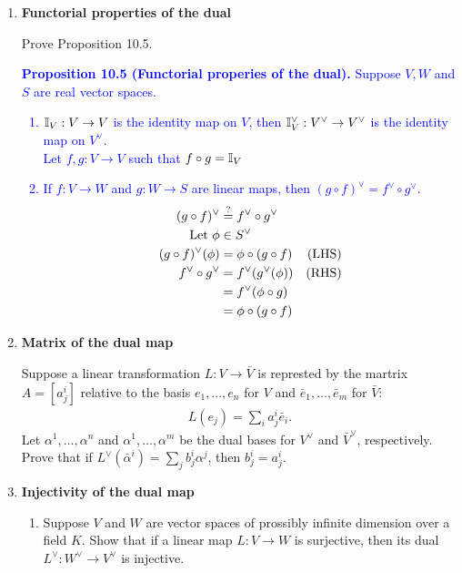 \documentclass[12pt,a4paper]{report}
\newcommand{\BLUE}[1]{\textcolor{blue}{#1}}
\begin{document}
\begin{enumerate}[label=10.\arabic*.]
\item \textbf{Functorial properties of the dual}

Prove Proposition 10.5.

\BLUE{\textbf{Proposition 10.5 (Functorial properies of the dual).}  Suppose $V, W$ and $S$ are real vector spaces.
\begin{enumerate}[label=(\roman*)]
	\item $\mathbb{I}_V: V \to V$ is the identity map on $V$, then $\mathbb{I}_V^\vee: V^\vee \to V^\vee$ is the identity map on $V^\vee$.\\
	Let $f,g:V \to V$ such that $f\circ g = \mathbb{I}_V$
	\item If $f: V \to W$ and $g: W \to S$ are linear maps, then $(g\circ f)^\vee = f^\vee \circ g^\vee$.
	\begin{align*}
	 (g\circ f)^\vee &\overset{?}= f^\vee \circ g^\vee \\
	 \text{Let } \phi &\in S^\vee \\
	(g\circ f)^\vee (\phi) &= \phi \circ (g \circ f) & \text{(LHS)} \\
	 f^\vee \circ g^\vee &= f^\vee(g^\vee(\phi))& \text{(RHS)}\\
	  &= f^\vee(\phi\circ g) \\
	 &= \phi\circ (g \circ f)
\end{align*}	  
\end{enumerate}
}

\item \textbf{Matrix of the dual map}

Suppose a linear transformation $L: V \to \bar{V}$ is represted by the martrix $A=[a_j^i]$ relative to the basis $e_1,\dots, e_n$ for $V$ and $\bar{e}_1,\dots,\bar{e}_m$ for $\bar{V}$:
\begin{align*}
	L(e_j) = \sum_i a_j^i\bar{e}_i.
\end{align*}Let $\alpha^1,\dots,\alpha^n$ and $\alpha^1,\dots,\alpha^m$ be the dual bases for $V^\vee$ and $\bar{V}^\vee$, respectively.  Prove that if $L^\vee(\bar{\alpha}^i)=\sum_jb_j^i\alpha^j$, then $b_j^i=a_j^i$.

\item \textbf{Injectivity of the dual map}

\begin{enumerate}[label=(\alph*)]

	\item Suppose $V$ and $W$ are vector spaces of prossibly infinite dimension over a field $K$.  Show that if a linear map $L:V \to W$ is surjective, then its dual $L^\vee:W^\vee\to V^\vee$ is injective.
	

\end{enumerate}
\end{enumerate}
\end{document}
